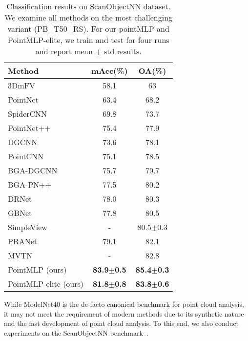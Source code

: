 \begin{wraptable}{r}{8.9cm}
\small
    \centering
    \vspace{-7mm}
    \caption{Classification results on ScanObjectNN dataset. We examine all methods on the most challenging variant (PB\_T50\_RS). For our pointMLP and PointMLP-elite, we train and test for four runs and report mean $\pm$ std results.
    }
    \label{tab:my_label}
    \vspace{1mm}
    \begin{tabular}{l|cc}
        \toprule
         Method & mAcc(\%) &OA(\%) \\
         \midrule
         3DmFV & 58.1&63\\
         PointNet~\citep{qi2017pointnet} &63.4 &68.2 \\
         SpiderCNN~\citep{xu2018spidercnn} &69.8 &73.7 \\
         PointNet++~\citep{qi2017pointnet++} &75.4 &77.9 \\
         DGCNN~\citep{wang2019dynamic} &73.6 &78.1 \\
         PointCNN~\citep{li2018pointcnn} &75.1 &78.5 \\
         BGA-DGCNN~\citep{uy2019revisiting} &75.7 &79.7 \\
         BGA-PN++~\citep{uy2019revisiting} &77.5 &80.2 \\
         DRNet~\citep{qiu2021dense} &78.0 &80.3 \\
         GBNet~\citep{qiu2021geometric} &77.8 &80.5 \\
         SimpleView~\citep{goyal2021revisiting} & - &80.5$\pm$0.3 \\
         PRANet~\citep{cheng2021net} & 79.1&82.1 \\
         MVTN~\citep{hamdi2021mvtn} & -&82.8 \\
         \midrule
         PointMLP \small{(ours)} &\textbf{83.9$\pm$0.5} &\textbf{85.4$\pm$0.3}\\
         
         PointMLP-elite \small{(ours)} &\textbf{81.8$\pm$0.8} &\textbf{83.8$\pm$0.6}\\
         
         \bottomrule
    \end{tabular}
    \label{tab:cls_scanobjectNN}
    \vspace{-3mm}
\end{wraptable}

While ModelNet40 is the de-facto canonical benchmark for point cloud analysis, it may not meet the requirement of modern methods due to its synthetic nature and the fast development of point cloud analysis. To this end, we also conduct experiments on the ScanObjectNN benchmark~\citep{uy2019revisiting}. 

